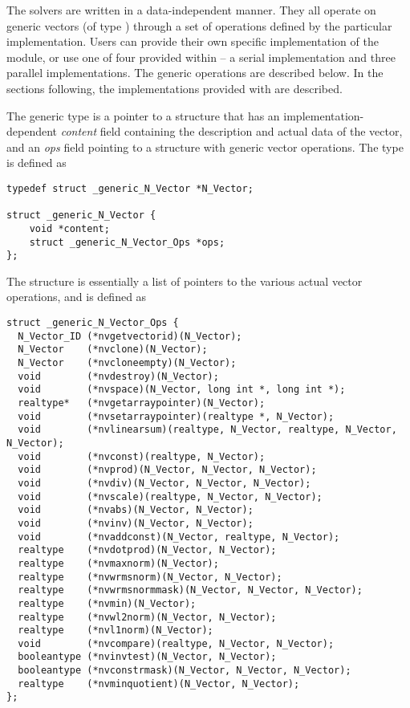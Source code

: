 %
The {\sundials} solvers are written in a data-independent manner. 
They all operate on generic vectors (of type ) through a set of
operations defined by the particular {\nvector} implementation.
Users can provide their own specific implementation of the {\nvector} module,
or use one of four provided within {\sundials} -- a serial implementation and
three parallel implementations.  The generic operations are described below.
In the sections following, the implementations provided with {\sundials}
are described.

The generic  type is a pointer to a structure that has an 
implementation-dependent {\em content} field containing the 
description and actual data of the vector, and an {\em ops} field 
pointing to a structure with generic vector operations.
The type  is defined as
\begin{verbatim}
typedef struct _generic_N_Vector *N_Vector;

struct _generic_N_Vector {
    void *content;
    struct _generic_N_Vector_Ops *ops;
};
\end{verbatim}
The  structure is essentially a list of pointers to
the various actual vector operations, and is defined as
\begin{verbatim}
struct _generic_N_Vector_Ops {
  N_Vector_ID (*nvgetvectorid)(N_Vector);
  N_Vector    (*nvclone)(N_Vector);
  N_Vector    (*nvcloneempty)(N_Vector);
  void        (*nvdestroy)(N_Vector);
  void        (*nvspace)(N_Vector, long int *, long int *);
  realtype*   (*nvgetarraypointer)(N_Vector);
  void        (*nvsetarraypointer)(realtype *, N_Vector);
  void        (*nvlinearsum)(realtype, N_Vector, realtype, N_Vector, N_Vector); 
  void        (*nvconst)(realtype, N_Vector);
  void        (*nvprod)(N_Vector, N_Vector, N_Vector);
  void        (*nvdiv)(N_Vector, N_Vector, N_Vector);
  void        (*nvscale)(realtype, N_Vector, N_Vector);
  void        (*nvabs)(N_Vector, N_Vector);
  void        (*nvinv)(N_Vector, N_Vector);
  void        (*nvaddconst)(N_Vector, realtype, N_Vector);
  realtype    (*nvdotprod)(N_Vector, N_Vector);
  realtype    (*nvmaxnorm)(N_Vector);
  realtype    (*nvwrmsnorm)(N_Vector, N_Vector);
  realtype    (*nvwrmsnormmask)(N_Vector, N_Vector, N_Vector);
  realtype    (*nvmin)(N_Vector);
  realtype    (*nvwl2norm)(N_Vector, N_Vector);
  realtype    (*nvl1norm)(N_Vector);
  void        (*nvcompare)(realtype, N_Vector, N_Vector);
  booleantype (*nvinvtest)(N_Vector, N_Vector);
  booleantype (*nvconstrmask)(N_Vector, N_Vector, N_Vector);
  realtype    (*nvminquotient)(N_Vector, N_Vector);
};
\end{verbatim}




